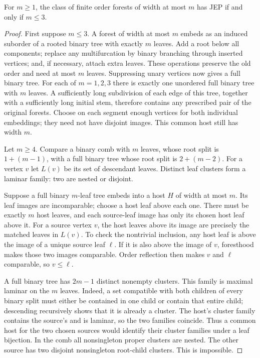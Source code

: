 \documentclass[11pt]{article}
\begin{document}
\begin{theorem}\label{thm:width}
For $m\geq1$, the class of finite order forests of width at most $m$
has JEP if and only if $m\leq3$.
\end{theorem}
\begin{proof}
First suppose $m\leq3$. A forest of width at most $m$ embeds as an
induced suborder of a rooted binary tree with exactly $m$ leaves.
Add a root below all components; replace any multifurcation by binary
branching through inserted vertices; and, if necessary, attach extra
leaves. These operations preserve the old order and need at most $m$
leaves. Suppressing unary vertices now gives a full binary tree.
For each of $m=1,2,3$ there is exactly one unordered full binary tree
with $m$ leaves. A sufficiently long subdivision of each edge of this
tree, together with a sufficiently long initial stem, therefore contains
any prescribed pair of the original forests. Choose on each segment
enough vertices for both individual embeddings; they need not have
disjoint images. This common host still has width $m$.

Let $m\geq4$. Compare a binary comb with $m$ leaves, whose root split
is $1+(m-1)$, with a full binary tree whose root split is $2+(m-2)$.
For a vertex $v$ let $L(v)$ be its set of descendant leaves. Distinct
leaf clusters form a laminar family: two are nested or disjoint.

Suppose a full binary $m$-leaf tree embeds into a host $H$ of width
at most $m$. Its leaf images are incomparable; choose a host leaf above
each one. There must be exactly $m$ host leaves, and each source-leaf
image has only its chosen host leaf above it. For a source vertex $v$,
the host leaves above its image are precisely the matched leaves in
$L(v)$. To check the nontrivial inclusion, any host leaf is above the
image of a unique source leaf $\ell$. If it is also above the image of
$v$, foresthood makes those two images comparable. Order reflection
then makes $v$ and $\ell$ comparable, so $v\leq\ell$.

A full binary tree has $2m-1$ distinct nonempty clusters. This family
is maximal laminar on the $m$ leaves. Indeed, a set compatible with
both children of every binary split must either be contained in one
child or contain that entire child; descending recursively shows that
it is already a cluster. The host's cluster family contains the
source's and is laminar, so the two families coincide. Thus a common
host for the two chosen sources would identify their cluster families
under a leaf bijection. In the comb all nonsingleton proper clusters
are nested. The other source has two disjoint nonsingleton root-child
clusters. This is impossible.
\end{proof}
\end{document}
